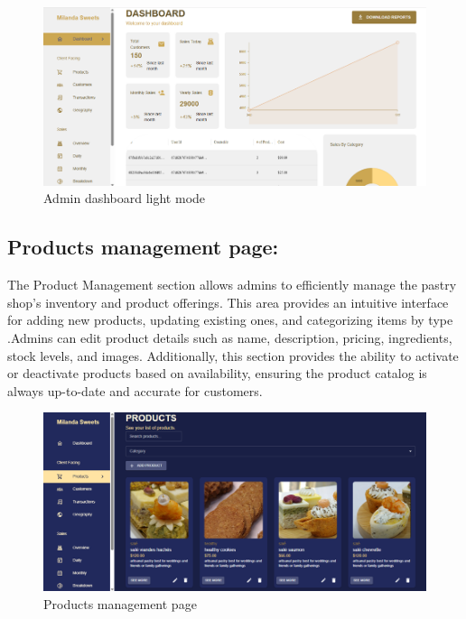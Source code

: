 \begin{figure}[!h]
\begin{center}
\includegraphics{images/Admin dashboard light mode.png}
\end{center}
\caption{Admin dashboard light mode}
\end{figure}

\newpage
\subsection{Products management page:}

The Product Management section allows admins to efficiently manage the pastry shop’s inventory and product offerings. This area provides an intuitive interface for adding new products, updating existing ones, and categorizing items by type .Admins can edit product details such as name, description, pricing, ingredients, stock levels, and images. Additionally, this section provides the ability to activate or deactivate products based on availability, ensuring the product catalog is always up-to-date and accurate for customers.

\begin{figure}[!h]
\begin{center}
\includegraphics{images/Products management page.png}
\end{center}
\caption{Products management page}
\end{figure}

